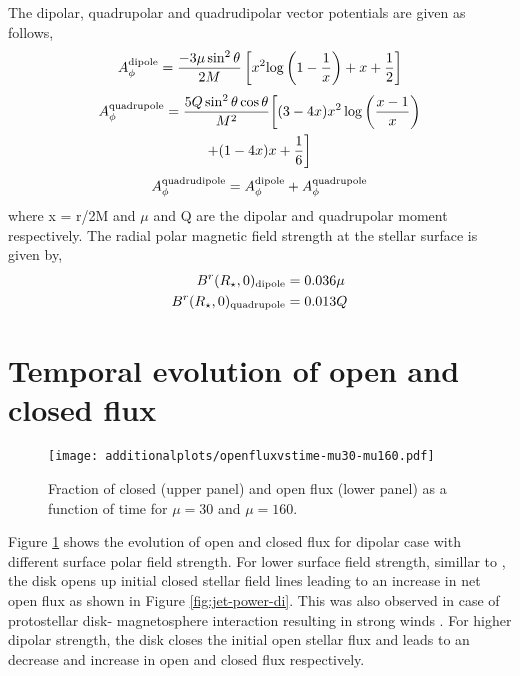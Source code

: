 \documentclass[fleqn,usenatbib]{mnras}
\newcommand{\rstar}{\ensuremath{R_{\star}}}
\begin{document}
The dipolar, quadrupolar and quadrudipolar vector potentials are given as follows,
\begin{align}
A_{\phi}^{\rm dipole} = \frac{-3 \mu \sin^2\theta}{2M} \left[ x^2 {\rm log}\left(1-\frac{1}{x}\right) + x + \frac{1}{2}\right]
\end{align}
\begin{multline}
A_{\phi}^{\rm quadrupole} = \frac{5 Q \sin^2\theta \cos\theta}{M^2}\bigg[(3-4 x) x^2 \log \left(\frac{x-1}{x}\right)\\
    +(1-4 x) x+\frac{1}{6} \bigg]
\end{multline}
\begin{align}
A_{\phi}^{\rm quadrudipole} = A_{\phi}^{\rm dipole} + A_{\phi}^{\rm quadrupole}
\end{align}
where x = r/2M and $\mu$ and Q are the dipolar and quadrupolar moment respectively. The radial polar magnetic field strength at the stellar surface is given by,
\begin{align}
  B^r(\rstar,0)_{\rm dipole} &= 0.036\mu\\
  B^r(\rstar,0)_{\rm quadrupole} &= 0.013Q
\end{align}

\section{Temporal evolution of open and closed flux}\label{sec:fluxopening}
\begin{figure}
   \centering
    \texttt{[image: additionalplots/openfluxvstime-mu30-mu160.pdf]}%
    \caption{Fraction of closed (upper panel) and open flux (lower panel) as a function of time for $\mu = 30$ and $\mu = 160$.}
    \label{fig:openfluxvstime}
\end{figure}
Figure \ref{fig:openfluxvstime} shows the evolution of open and closed flux for dipolar case with different surface polar field strength. For lower surface field strength, simillar to , the disk opens up initial closed stellar field lines leading to an increase in net open flux as shown in Figure \ref{fig:jet-power-di}. This was also observed in case of protostellar disk- magnetosphere interaction resulting in strong winds \citep{Ferreira2000}. For higher dipolar strength, the disk closes the initial open stellar flux and leads to an decrease and increase in open and closed flux respectively.



\bsp	%
\label{lastpage}
\end{document}

